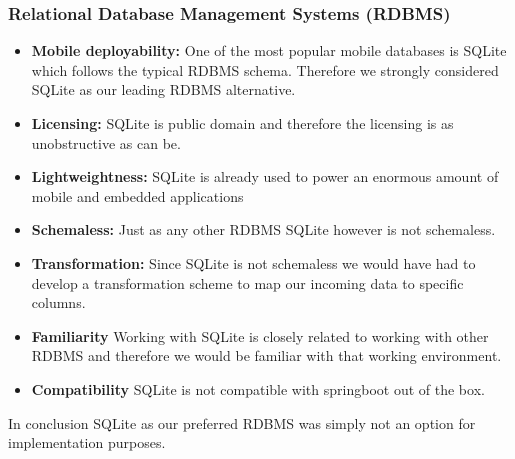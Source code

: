 \subsubsection{Relational Database Management Systems (RDBMS)}
\label{databaseRDBS}
\begin{itemize}
\item \label{rdbms_req_one} \textbf{Mobile deployability:}
One of the most popular mobile databases is SQLite which follows the typical RDBMS schema.\cite{dbcharts} Therefore we strongly considered SQLite as our leading RDBMS alternative.
\item \label{rdbms_req_two} \textbf{Licensing:}
SQLite is public domain and therefore the licensing is as unobstructive as can be.
\item \label{rdbms_item_three} \textbf{Lightweightness:}
SQLite is already used to power an enormous amount of mobile and embedded applications\cite{sqlite}
\item \label{rdbms_req_four} \textbf{Schemaless:}
Just as any other RDBMS SQLite however is not schemaless.
\item \label{rdbms_req_five} \textbf{Transformation:}
Since SQLite is not schemaless we would have had to develop a transformation scheme to map our incoming data to specific columns.
\item \label{rdbms_req_six} \textbf{Familiarity}
Working with SQLite is closely related to working with other RDBMS and therefore we would be familiar with that working environment.
\item \label{rdbms_req_seven} \textbf{Compatibility}
SQLite is not compatible with springboot out of the box.
\end{itemize}
In conclusion SQLite as our preferred RDBMS was simply not an option for implementation purposes.

